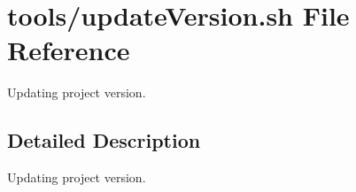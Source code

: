 \hypertarget{updateVersion_8sh}{}\section{tools/update\+Version.sh File Reference}
\label{updateVersion_8sh}


Updating project version.  




\subsection{Detailed Description}
Updating project version. 

